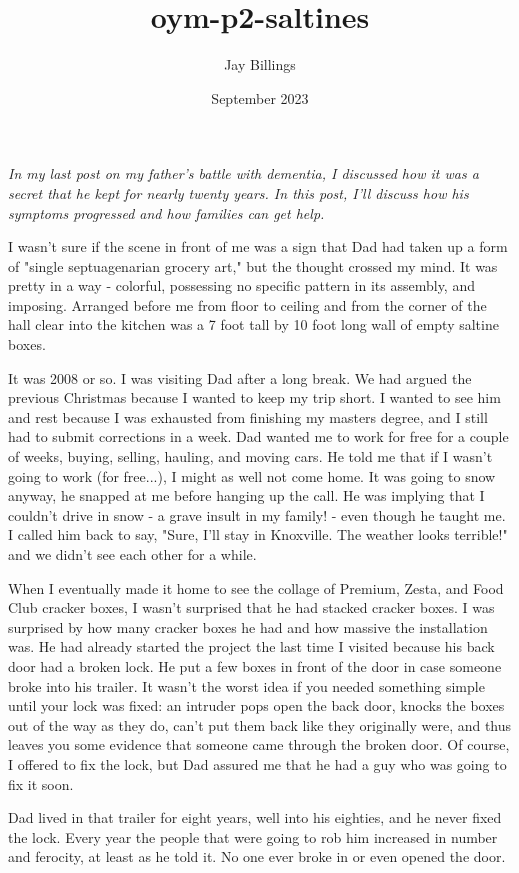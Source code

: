 \documentclass{article}
\title{oym-p2-saltines}
\author{Jay Billings}
\date{September 2023}
\begin{document}
\maketitle

\textit{In my last post on my father's battle with dementia, I discussed how it was a secret that he kept for nearly twenty years. In this post, I'll discuss how his symptoms progressed and how families can get help.}

I wasn't sure if the scene in front of me was a sign that Dad had taken up a form of "single septuagenarian grocery art," but the thought crossed my mind. It was pretty in a way - colorful, possessing no specific pattern in its assembly, and imposing. Arranged before me from floor to ceiling and from the corner of the hall clear into the kitchen was a 7 foot tall by 10 foot long wall of empty saltine boxes.

It was 2008 or so. I was visiting Dad after a long break. We had argued the previous Christmas because I wanted to keep my trip short. I wanted to see him and rest because I was exhausted from finishing my masters degree, and I still had to submit corrections in a week. Dad wanted me to work for free for a couple of weeks, buying, selling, hauling, and moving cars. He told me that if I wasn't going to work (for free...), I might as well not come home. It was going to snow anyway, he snapped at me before hanging up the call. He was implying that I couldn't drive in snow - a grave insult in my family! - even though he taught me. I called him back to say, "Sure, I'll stay in Knoxville. The weather looks terrible!" and we didn't see each other for a while.

When I eventually made it home to see the collage of Premium, Zesta, and Food Club cracker boxes, I wasn't surprised that he had stacked cracker boxes. I was surprised by how many cracker boxes he had and how massive the installation was. He had already started the project the last time I visited because his back door had a broken lock. He put a few boxes in front of the door in case someone broke into his trailer. It wasn't the worst idea if you needed something simple until your lock was fixed: an intruder pops open the back door, knocks the boxes out of the way as they do, can't put them back like they originally were, and thus leaves you some evidence that someone came through the broken door. Of course, I offered to fix the lock, but Dad assured me that he had a guy who was going to fix it soon.

Dad lived in that trailer for eight years, well into his eighties, and he never fixed the lock. Every year the people that were going to rob him increased in number and ferocity, at least as he told it. No one ever broke in or even opened the door.
\end{document}
